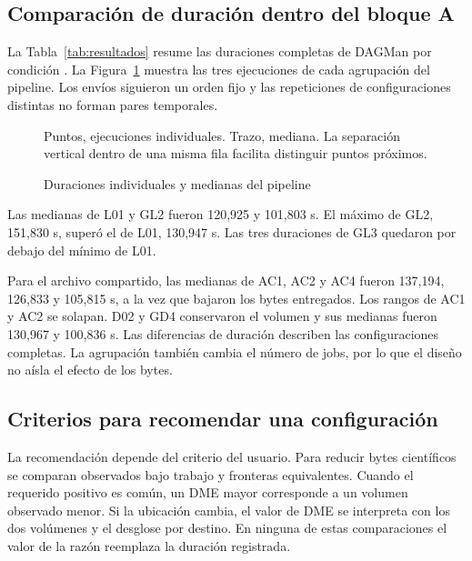 \subsection{Comparación de duración dentro del bloque A}
\label{sec:duracion_a}
La Tabla~\ref{tab:resultados} resume las duraciones completas de DAGMan por condición \citep{htcondortiming}. La Figura~\ref{fig:tiempos_pipeline} muestra las tres ejecuciones de cada agrupación del pipeline. Los envíos siguieron un orden fijo y las repeticiones de configuraciones distintas no forman pares temporales.

\begin{figure}[htbp]
\caption{Duraciones individuales y medianas del pipeline}
\label{fig:tiempos_pipeline}
\centering
{}
\par\smallskip\footnotesize Puntos, ejecuciones individuales. Trazo, mediana. La separación vertical dentro de una misma fila facilita distinguir puntos próximos.
\end{figure}

Las medianas de L01 y GL2 fueron 120,925 y 101,803 s. El máximo de GL2, 151,830 s, superó el de L01, 130,947 s. Las tres duraciones de GL3 quedaron por debajo del mínimo de L01.

Para el archivo compartido, las medianas de AC1, AC2 y AC4 fueron 137,194, 126,833 y 105,815 s, a la vez que bajaron los bytes entregados. Los rangos de AC1 y AC2 se solapan. D02 y GD4 conservaron el volumen y sus medianas fueron 130,967 y 100,836 s. Las diferencias de duración describen las configuraciones completas. La agrupación también cambia el número de jobs, por lo que el diseño no aísla el efecto de los bytes.

\subsection{Criterios para recomendar una configuración}
\label{sec:decisiones_a}
La recomendación depende del criterio del usuario. Para reducir bytes científicos se comparan observados bajo trabajo y fronteras equivalentes. Cuando el requerido positivo es común, un DME mayor corresponde a un volumen observado menor. Si la ubicación cambia, el valor de DME se interpreta con los dos volúmenes y el desglose por destino. En ninguna de estas comparaciones el valor de la razón reemplaza la duración registrada.



